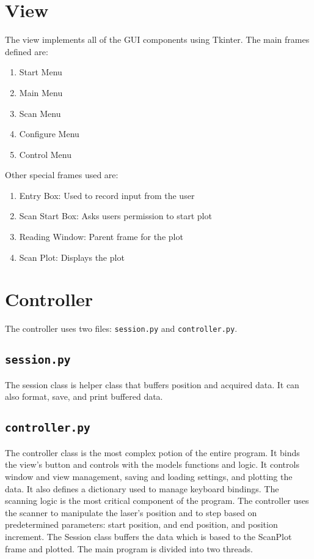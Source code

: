 \documentclass[11pt]{article}
\begin{document}
\section{View}
The view implements all of the GUI components using Tkinter. The main frames defined are:
\begin{enumerate}
    \item Start Menu
    \item Main Menu
    \item Scan Menu
    \item Configure Menu
    \item Control Menu
\end{enumerate}
Other special frames used are:
\begin{enumerate}
    \item Entry Box: Used to record input from the user 
    \item Scan Start Box: Asks users permission to start plot 
    \item Reading Window: Parent frame for the plot 
    \item Scan Plot: Displays the plot  
\end{enumerate}
\section{Controller}
The controller uses two files: \texttt{session.py} and \texttt{controller.py}.
\subsection{\texttt{session.py}}
The session class is helper class that buffers position and acquired data. It can also format, save, and print buffered data.
\subsection{\texttt{controller.py}}
The controller class is the most complex potion of the entire program. It binds the view's button and controls with the models functions and logic. It  controls window and view management, saving and loading settings, and plotting the data. It also defines a dictionary used to manage keyboard bindings. 
The scanning logic is the most critical component of the program. The controller uses the scanner to manipulate the laser's position and to step  based on predetermined parameters: start position, and end position, and position increment. The Session class buffers the data which is based to the ScanPlot frame and plotted. The main program  is divided into two threads.
\end{document}
